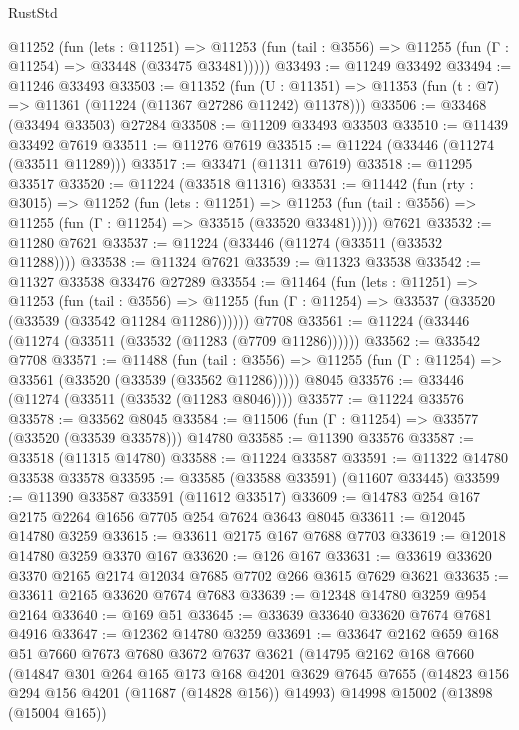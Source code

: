 \begin{lexlean}{RustStd}
\begin{coremodule}
    @11252
      (fun (lets : @11251) =>
      @11253 (fun (tail : @3556) => @11255 (fun (Γ : @11254) => @33448 (@33475 @33481)))))
@33493 := @11249 @33492
@33494 := @11246 @33493
@33503 := @11352
    (fun (U : @11351) => @11353 (fun (t : @7) => @11361 (@11224 (@11367 @27286 @11242) @11378)))
@33506 := @33468 (@33494 @33503) @27284
@33508 := @11209 @33493 @33503
@33510 := @11439 @33492 @7619
@33511 := @11276 @7619
@33515 := @11224 (@33446 (@11274 (@33511 @11289)))
@33517 := @33471 (@11311 @7619)
@33518 := @11295 @33517
@33520 := @11224 (@33518 @11316)
@33531 := @11442
    (fun (rty : @3015) =>
    @11252
      (fun (lets : @11251) =>
      @11253 (fun (tail : @3556) => @11255 (fun (Γ : @11254) => @33515 (@33520 @33481)))))
    @7621
@33532 := @11280 @7621
@33537 := @11224 (@33446 (@11274 (@33511 (@33532 @11288))))
@33538 := @11324 @7621
@33539 := @11323 @33538
@33542 := @11327 @33538 @33476 @27289
@33554 := @11464
    (fun (lets : @11251) =>
    @11253
      (fun (tail : @3556) =>
      @11255 (fun (Γ : @11254) => @33537 (@33520 (@33539 (@33542 @11284 @11286))))))
    @7708
@33561 := @11224 (@33446 (@11274 (@33511 (@33532 (@11283 (@7709 @11286))))))
@33562 := @33542 @7708
@33571 := @11488
    (fun (tail : @3556) => @11255 (fun (Γ : @11254) => @33561 (@33520 (@33539 (@33562 @11286)))))
    @8045
@33576 := @33446 (@11274 (@33511 (@33532 (@11283 @8046))))
@33577 := @11224 @33576
@33578 := @33562 @8045
@33584 := @11506 (fun (Γ : @11254) => @33577 (@33520 (@33539 @33578))) @14780
@33585 := @11390 @33576
@33587 := @33518 (@11315 @14780)
@33588 := @11224 @33587
@33591 := @11322 @14780 @33538 @33578
@33595 := @33585 (@33588 @33591) (@11607 @33445)
@33599 := @11390 @33587 @33591 (@11612 @33517)
@33609 := @14783 @254 @167 @2175 @2264 @1656 @7705 @254 @7624 @3643 @8045
@33611 := @12045 @14780 @3259
@33615 := @33611 @2175 @167 @7688 @7703
@33619 := @12018 @14780 @3259 @3370 @167
@33620 := @126 @167
@33631 := @33619 @33620 @3370 @2165 @2174 @12034 @7685 @7702 @266 @3615 @7629 @3621
@33635 := @33611 @2165 @33620 @7674 @7683
@33639 := @12348 @14780 @3259 @954 @2164
@33640 := @169 @51
@33645 := @33639 @33640 @33620 @7674 @7681 @4916
@33647 := @12362 @14780 @3259
@33691 := @33647
    @2162
    @659
    @168
    @51
    @7660
    @7673
    @7680
    @3672
    @7637
    @3621
    (@14795
      @2162
      @168
      @7660
      (@14847
        @301
        @264
        @165
        @173
        @168
        @4201
        @3629
        @7645
        @7655
        (@14823 @156 @294 @156 @4201 (@11687 (@14828 @156)) @14993)
        @14998
        @15002
        (@13898 (@15004 @165))

\end{coremodule}
\end{lexlean}
